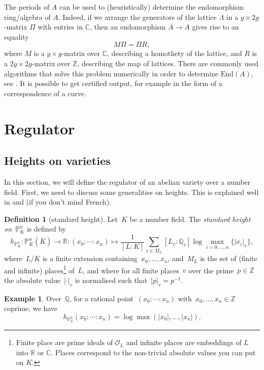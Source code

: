 \documentclass[12pt]{article}
\theoremstyle{definition}
\newtheorem{definition}[theorem]{Definition}
\newtheorem{example}[theorem]{Example}
\numberwithin{equation}{subsection}
\newcommand{\C}{\ensuremath{\mathbb{C}}}
\newcommand{\R}{\ensuremath{\mathbb{R}}}
\newcommand{\Q}{\ensuremath{\mathbb{Q}}}
\newcommand{\Z}{\ensuremath{\mathbb{Z}}}
\renewcommand{\P}{\ensuremath{\mathbb{P}}}
\begin{document}
The periods of $A$ can be used to (heuristically) determine the endomorphism ring/algebra of $A$.
Indeed, if we arrange the generators of the lattice $\Lambda$ in a $g \times 2g$-matrix $\Pi$ with entries in $\mathbb{C}$, then an endomorphism $A \to A$ gives rise to an equality
$$M\Pi = \Pi R,$$
where $M$ is a $g \times g$-matrix over $\C$, describing a homothety of the lattice, and $R$ is a $2g \times 2g$-matrix over $\Z$, describing the map of lattices. There are commonly used algorithms that solve this problem numerically in order to determine $\mathrm{End}(A)$, see \cite{endomorphisms}. It is possible to get certified output, for example in the form of a correspondence of a curve.

\section{Regulator}

\subsection{Heights on varieties}

In this section, we will define the regulator of an abelian variety over a number field. First, we need to discuss some generalities on heights. This is explained well in \cite{Lang} and \cite{Neron} (if you don't mind French).

\begin{definition}[standard height]
Let~$K$ be a number field. The {\em standard height on~$\P^n_K$} is defined by
$$h_{\P^n_K}  \colon \P^n_K(\overline{K}) \rightarrow \R \colon (x_0 : \cdots : x_n) \mapsto \frac{1}{[L:K]} \sum_{v \in M_L} [L_v : \Q_v] \log \max_{i = 0, \ldots, n} \{|x_i|_v\},$$
where~$L/K$ is a finite extension containing~$x_0, \ldots, x_n$, and~$M_L$ is the set of (finite and infinite) places\footnote{Finite place are prime ideals of $\mathcal{O}_L$ and infinite places are embeddings of $L$ into $\R$ or $\C$. Places correspond to the non-trivial absolute values you can put on $K$.} of~$L$, and where for all finite places~$v$ over the prime~$p \in \Z$ the absolute value~$| \cdot |_v$ is normalised such that~$|p|_v = p^{-1}$.
\end{definition}

\begin{example}
Over~$\Q$, for a rational point~$(x_0 : \cdots : x_n)$ with~$x_0, \ldots, x_n \in \Z$ coprime, we have~$$h_{\mathbb{P}^n_{\Q}}(x_0 : \cdots : x_n) = \log\max(|x_0|, \ldots, |x_n|).$$
\end{example}
\end{document}
